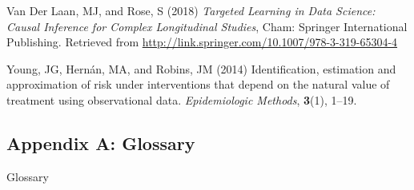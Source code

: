 \documentclass[
  single column]{article}
\newlength{\cslhangindent}
\newenvironment{CSLReferences}[2] %
 {\begin{list}{}{%
  \setlength{\itemindent}{0pt}
  \setlength{\leftmargin}{0pt}
  \setlength{\parsep}{0pt}
  \ifodd #1
   \setlength{\leftmargin}{\cslhangindent}
   \setlength{\itemindent}{-1\cslhangindent}
  \fi
  \setlength{\itemsep}{#2\baselineskip}}}
 {\end{list}}
\begin{document}
\begin{CSLReferences}{1}{0}
Van Der Laan, MJ, and Rose, S (2018) \emph{Targeted Learning in Data
Science: Causal Inference for Complex Longitudinal Studies}, Cham:
Springer International Publishing. Retrieved from
\url{http://link.springer.com/10.1007/978-3-319-65304-4}

Young, JG, Hernán, MA, and Robins, JM (2014) Identification, estimation
and approximation of risk under interventions that depend on the natural
value of treatment using observational data. \emph{Epidemiologic
Methods}, \textbf{3}(1), 1--19.

\end{CSLReferences}

\newpage{}

\subsection{Appendix A: Glossary}\label{id-app-a}

\begin{table}

\caption{\label{tbl-experiments}Glossary}

\centering{

\glossaryTerms

}

\end{table}%
\end{document}
